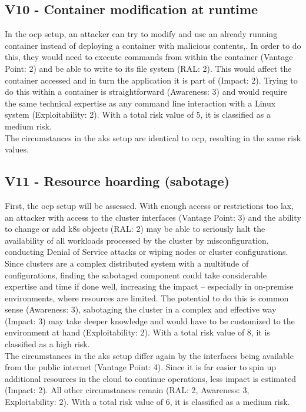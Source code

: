 \subsection{V10 - Container modification at runtime}

In the \gls{ocp} setup, an attacker can try to modify and use an already running container instead of deploying a container with malicious contents,. In order to do this, they would need to execute commands from within the container (Vantage Point: 2) and be able to write to its file system (RAL: 2). This would affect the container accessed and in turn the application it is part of (Impact: 2).
Trying to do this within a container is straightforward (Awareness: 3) and would require the same technical expertise as any command line interaction with a Linux system (Exploitability: 2).
With a total risk value of 5, it is classified as a medium risk. \\
The circumstances in the \gls{aks} setup are identical to \gls{ocp}, resulting in the same risk values.

\subsection{V11 - Resource hoarding (sabotage)}

First, the \gls{ocp} setup will be assessed.
With enough access or restrictions too lax, an attacker with access to the cluster interfaces (Vantage Point: 3) and the ability to change or add \gls{k8s} objects (RAL: 2)  may be able to seriously halt the availability of all workloads processed by the cluster by misconfiguration, conducting Denial of Service attacks or wiping nodes or cluster configurations. Since clusters are a complex distributed system with a multitude of configurations, finding the sabotaged component could take considerable expertise and time if done well, increasing the impact – especially in on-premise environments, where resources are limited.
The potential to do this is common sense (Awareness: 3), sabotaging the cluster in a complex and effective way (Impact: 3) may take deeper knowledge and would have to be customized to the environment at hand (Exploitability: 2).
With a total risk value of 8, it is classified as a high risk. \\
The circumstances in the \gls{aks} setup differ again by the interfaces being available from the public internet (Vantage Point: 4).
Since it is far easier to spin up additional resources in the cloud to continue operations, less impact is estimated (Impact: 2).
All other circumstances remain (RAL: 2, Awareness: 3, Exploitability: 2).
With a total risk value of 6, it is classified as a medium risk.

